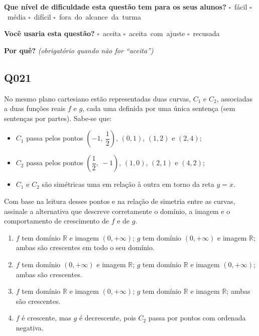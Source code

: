 \documentclass[11pt,a4paper]{article}
\begin{document}
\textbf{Que nível de dificuldade esta questão tem para os seus alunos?}\quad
\mbox{$\square$~fácil} \quad \mbox{$\square$~média} \quad
\mbox{$\square$~difícil} \quad \mbox{$\square$~fora do alcance da turma}

\textbf{Você usaria esta questão?}\quad
\mbox{$\square$~aceita} \quad \mbox{$\square$~aceita com ajuste} \quad
\mbox{$\square$~recusada}

\textbf{Por quê?} \emph{(obrigatório quando não for ``aceita'')}

\underline{\hspace{\linewidth}}

\underline{\hspace{\linewidth}}
\vspace{0.6em}

\begin{samepage}
\subsection*{Q021}
No mesmo plano cartesiano estão representadas duas curvas, $C_1$ e $C_2$, associadas a duas funções reais $f$ e $g$, cada uma definida por uma única sentença (sem sentenças por partes). Sabe-se que:

\begin{itemize}[nosep,leftmargin=*]
\item $C_1$ passa pelos pontos $\left(-1,\ \dfrac{1}{2}\right)$, $(0,1)$, $(1,2)$ e $(2,4)$;
\item $C_2$ passa pelos pontos $\left(\dfrac{1}{2},\ -1\right)$, $(1,0)$, $(2,1)$ e $(4,2)$;
\item $C_1$ e $C_2$ são simétricas uma em relação à outra em torno da reta $y=x$.
\end{itemize}

Com base na leitura desses pontos e na relação de simetria entre as curvas, assinale a alternativa que descreve corretamente o domínio, a imagem e o comportamento de crescimento de $f$ e de $g$.
\begin{enumerate}[label=(\alph*),nosep,leftmargin=*]
\item $f$ tem domínio $\mathbb{R}$ e imagem $(0,+\infty)$; $g$ tem domínio $(0,+\infty)$ e imagem $\mathbb{R}$; ambas são crescentes em todo o seu domínio.
\item $f$ tem domínio $(0,+\infty)$ e imagem $\mathbb{R}$; $g$ tem domínio $\mathbb{R}$ e imagem $(0,+\infty)$; ambas são crescentes.
\item $f$ tem domínio $\mathbb{R}$ e imagem $(0,+\infty)$; $g$ tem domínio $\mathbb{R}$ e imagem $\mathbb{R}$; ambas são crescentes.
\item $f$ é crescente, mas $g$ é decrescente, pois $C_2$ passa por pontos com ordenada negativa.
\end{enumerate}


\end{samepage}
\end{document}
